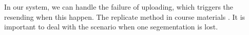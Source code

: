 
In our system, we can handle the failure of uploading, which triggers the
resending when this happen.
The replicate method in course materials \cite{Harp1991}\cite{Frangipani1997}.
It is important to deal with the scenario when one segementation is lost.
